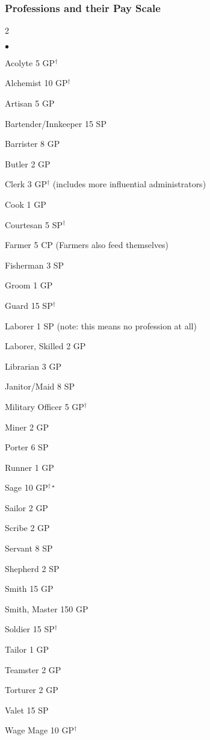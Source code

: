 \subsubsection{Professions and their Pay Scale}



\begin{multicols}{2}
\begin{small}
\begin{list}{$\bullet$}{\itemspace}
    \item Acolyte 5 GP$^\dagger$
    \item Alchemist 10 GP$^\dagger$
    \item Artisan 5 GP
    \item Bartender/Innkeeper 15 SP
    \item Barrister 8 GP
    \item Butler 2 GP
    \item Clerk 3 GP$^\dagger$ (includes more influential administrators)
    \item Cook 1 GP
    \item Courtesan 5 SP$^\dagger$
    \item Farmer 5 CP (Farmers also feed themselves)
    \item Fisherman 3 SP
    \item Groom 1 GP
    \item Guard 15 SP$^\dagger$
    \item Laborer 1 SP (note: this means no profession at all)
    \item Laborer, Skilled 2 GP
    \item Librarian 3 GP
    \item Janitor/Maid 8 SP
    \item Military Officer 5 GP$^\dagger$
    \item Miner 2 GP
    \item Porter 6 SP
    \item Runner 1 GP
    \item Sage 10 GP$^{\dagger \star}$
    \item Sailor 2 GP
    \item Scribe 2 GP
    \item Servant 8 SP
    \item Shepherd 2 SP
    \item Smith 15 GP
    \item Smith, Master 150 GP
    \item Soldier 15 SP$^\dagger$
    \item Tailor 1 GP
    \item Teamster 2 GP
    \item Torturer 2 GP
    \item Valet 15 SP
    \item Wage Mage 10 GP$^\dagger$
\end{list}


\end{small}
\end{multicols}
